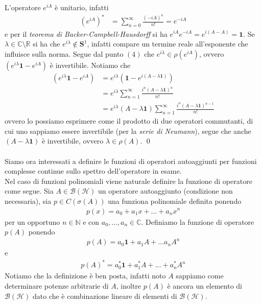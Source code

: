 \documentclass{article}
\numberwithin{equation}{subsection}
\begin{document}
L'operatore $e^{iA}$ è unitario, infatti
\begin{align*}
    (e^{iA})^* &= \sum_{n = 0}^\infty \frac{(-iA)^n}{n!} = e^{-iA} 
\end{align*}
e per il \textit{teorema di Backer-Campbell-Hausdorff} si ha $e^{iA}e^{-iA} = e^{i(A - A)} = \mathbf{1}$. Se $\lambda \in \mathbb{C} \setminus \mathbb{R}$ si ha che $e^{i\lambda} \not\in \mathbf{S}^1$, infatti compare un termine reale all'esponente che influisce sulla norma. Segue dal punto $(4)$ che $e^{i\lambda} \in \rho(e^{iA})$, ovvero $(e^{i\lambda}\mathbf{1} - e^{iA})$ è invertibile. Notiamo che 
\begin{align*}
    (e^{i\lambda}\mathbf{1} - e^{iA}) &= e^{i\lambda}(\mathbf{1} - e^{i(A - \lambda\mathbf{1})})  \\
    &= e^{i\lambda}\sum_{n = 1}^\infty \frac{i^n(A - \lambda\mathbf{1})^n}{n!}  \\
    &= e^{i\lambda}(A - \lambda\mathbf{1})\sum_{n = 1}^\infty \frac{i^n(A - \lambda\mathbf{1})^{n - 1}}{n!} 
\end{align*}
ovvero lo possiamo esprimere come il prodotto di due operatori commutanti, di cui uno sappiamo essere invertibile (per la \textit{serie di Neumann}), segue che anche $(A - \lambda\mathbf{1})$ è invertibile, ovvero $\lambda \in \rho(A)$. \qed \\ \\
Siamo ora interessati a definire le funzioni di operatori autoaggiunti per funzioni complesse continue sullo spettro dell'operatore in esame. \\
Nel caso di funzioni polinomiali viene naturale definire la funzione di operatore come segue. Sia $A \in \mathcal{B}(\mathcal{H})$ un operatore autoaggiunto (condizione non necessaria), sia $p \in C(\sigma(A))$ una funziona polinomiale definita ponendo 
\begin{align*}
    p(x) = a_0 + a_1x + \dots + a_nx^n 
\end{align*}
per un opportuno $n \in \mathbb{N}$ e con $a_0, \dots, a_n \in \mathbb{C}$. Definiamo la funzione di operatore $p(A)$ ponendo
\begin{align*}
    p(A) = a_0\mathbf{1} + a_1A + \dots a_nA^n 
\end{align*}
e 
\begin{align*}
    p(A)^* = a_0^*\mathbf{1} + a_1^*A + \dots + a_n^*A^n 
\end{align*}
Notiamo che la definizione è ben posta, infatti noto $A$ sappiamo come determinare potenze arbitrarie di $A$, inoltre $p(A)$ è ancora un elemento di $\mathcal{B}(\mathcal{H})$ dato che è combinazione lineare di elementi di $\mathcal{B}(\mathcal{H})$. \\
\end{document}
